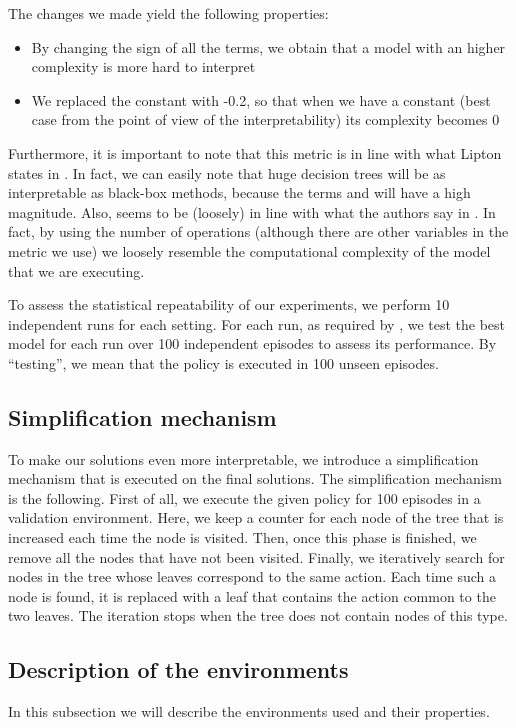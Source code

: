 \documentclass[review,english]{elsarticle}
\begin{document}
The changes we made yield the following properties:
\begin{itemize}
    \item By changing the sign of all the terms, we obtain that a model with an higher complexity is more hard to interpret
    \item We replaced the constant with -0.2, so that when we have a constant (best case from the point of view of the interpretability) its complexity becomes 0
\end{itemize}
Furthermore, it is important to note that this metric is in line with what Lipton states in \cite{lipton_mythos_2017}. 
In fact, we can easily note that huge decision trees will be as interpretable as black-box methods, because the terms  and  will have a high magnitude.
Also,  seems to be (loosely) in line with what the authors say in \cite{barcelo_model_2020}.
In fact, by using the number of operations (although there are other variables in the metric we use) we loosely resemble the computational complexity of the model that we are executing.


To assess the statistical repeatability of our experiments, we perform 10 independent runs for each setting.
For each run, as required by \cite{brockman2016openai}, we test the best model for each run over 100 independent episodes to assess its performance.
By ``testing'', we mean that the policy is executed in 100 unseen episodes.

\subsection{Simplification mechanism}
To make our solutions even more interpretable, we introduce a simplification mechanism that is executed on the final solutions.
The simplification mechanism is the following.
First of all, we execute the given policy for 100 episodes in a validation environment.
Here, we keep a counter for each node of the tree that is increased each time the node is visited.
Then, once this phase is finished, we remove all the nodes that have not been visited.
Finally, we iteratively search for nodes in the tree whose leaves correspond to the same action.
Each time such a node is found, it is replaced with a leaf that contains the action common to the two leaves.
The iteration stops when the tree does not contain nodes of this type.


\subsection{Description of the environments}
In this subsection we will describe the environments used and their properties.
\end{document}
